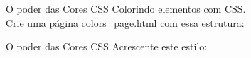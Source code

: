 \documentclass{beamer}
\begin{document}
\begin{frame}{O poder das Cores CSS}
Colorindo elementos com CSS.\\
Crie uma página colors\_page.html com essa estrutura:
	\begin{center}
	 
	\end{center}	  
\end{frame}
\begin{frame}{O poder das Cores CSS}
Acrescente este estilo:
	\begin{center}
	 
	\end{center}	  
\end{frame}
\end{document}
